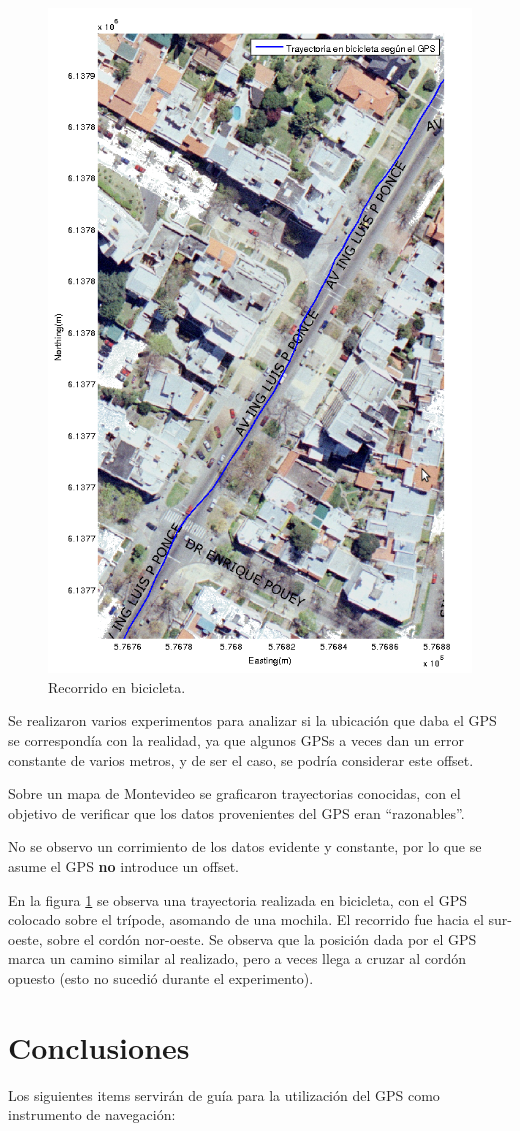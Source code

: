 \documentclass[main]{subfiles}
\begin{document}
\begin{figure}
  \begin{center}
\vspace{-80pt}
  \includegraphics[height=.5\textwidth]{./pics_gps/ponce.png}
  \end{center}
\vspace{-20pt}
  \caption{Recorrido en bicicleta.}
  \label{fig:ponce.png}
\vspace{-10pt}
\end{figure}

Se realizaron varios experimentos para analizar si la ubicación que daba el GPS se correspondía con la realidad, ya que algunos GPSs a veces dan un error constante de varios metros, y de ser el caso, se podría considerar este offset.

Sobre un mapa de Montevideo se graficaron trayectorias conocidas, con el objetivo de verificar que los datos provenientes del GPS eran ``razonables''.

No se observo un corrimiento de los datos evidente y constante, por lo que se asume el GPS \textbf{no} introduce un offset.

En la figura \ref{fig:ponce.png} se observa una trayectoria realizada en bicicleta, con el GPS colocado sobre el trípode, asomando de una mochila. El recorrido fue hacia el sur-oeste, sobre el cord\'on nor-oeste. Se observa que la posici\'on dada por el GPS marca un camino similar al realizado, pero a veces llega a cruzar al cord\'on opuesto (esto no sucedi\'o durante el experimento).

\section{Conclusiones}
\label{sec:conclusion}

Los siguientes items servirán de guía para la utilización del GPS como instrumento de navegación:
\end{document}
